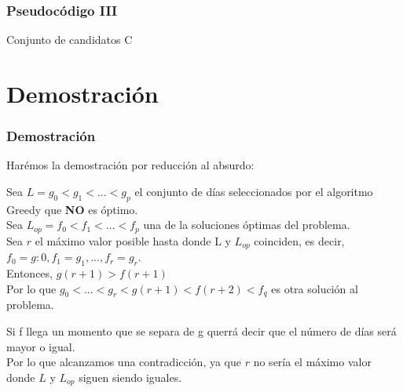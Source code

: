 \documentclass{beamer}
\begin{document}
\begin{frame}
	\frametitle{Pseudocódigo III}
	\begin{algorithmic}
	\Require Conjunto de candidatos C
	

  	   	\EndIf
	\EndWhile
	\end{algorithmic}	
	
\end{frame}

\section{Demostración} 
\begin{frame}
	\frametitle{Demostración}
	Harémos la demostración por reducción al absurdo:
	
	Sea $ L = g_0 < g_1 < ... < g_p $ el conjunto de días seleccionados por el algoritmo Greedy que \textbf{NO} es óptimo.\\
	
	Sea $ L_{op} = f_0 < f_1 < ... < f_p $ una de la soluciones óptimas del problema.\\
	
	Sea $r$ el máximo valor posible hasta donde L y $L_{op}$ coinciden, es decir, $f_0=g:0, f_1=g_1,...,f_r = g_r$.\\
	Entonces, $g(r+1) > f(r+1)$ \\
	Por lo que $g_0 < ... < g_r < g(r+1) < f(r+2) < f_q $ es otra solución al problema. 
	
	Si f llega un momento que se separa de g querrá decir que el número de días será mayor o igual.\\
	Por lo que alcanzamos una contradicción, ya que $r$  no sería el máximo valor donde $L$ y $L_{op}$ siguen siendo iguales.
\end{frame}
\end{document}

